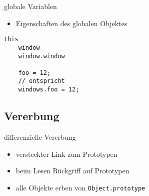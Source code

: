 \begin{frame}[fragile]{globale Variablen}
  \begin{itemize}
    \item Eigenschaften des globalen Objektes
  \end{itemize}
  
  \begin{lstlisting}[gobble=4]
    this
    window
    window.window
  
    foo = 12;
    // entspricht
    windows.foo = 12;
  \end{lstlisting}
\end{frame}

\subsection{Vererbung}

\begin{frame}{differenzielle Vererbung}
  \begin{itemize}
    \item versteckter Link zum Prototypen
    \item beim Lesen Rückgriff auf Prototypen
    \item alle Objekte erben von \lstinline-Object.prototype-  
  \end{itemize}
\end{frame}  
  
